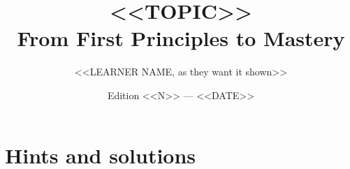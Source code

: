 \documentclass[11pt,oneside]{book}
\title{\sffamily\bfseries <<TOPIC>>\\[6pt]\Large\mdseries From First Principles to Mastery}
\author{\sffamily <<LEARNER NAME, as they want it shown>>}
\date{\sffamily Edition <<N>> --- <<DATE>>}
\begin{document}
\frontmatter
\maketitle

\tableofcontents

\mainmatter
% 

\appendix
\chapter{Hints and solutions}
% 

\backmatter


\end{document}
